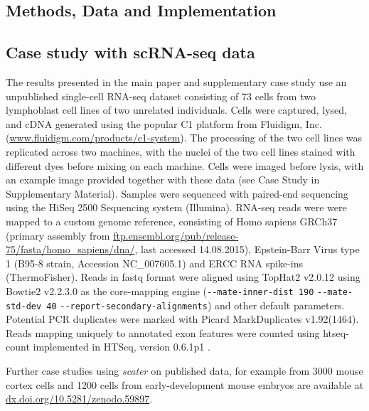 \documentclass{bioinfo}
\begin{document}
\begin{methods}
\section{Methods, Data and Implementation}\label{methods-data-and-implementation}

\subsection{Case study with scRNA-seq data}\label{case-study-with-scrna-seq-data}

The results presented in the main paper and supplementary case study use an unpublished single-cell RNA-seq dataset consisting of 73 cells from two lymphoblast cell lines of two unrelated individuals. Cells were captured, lysed, and cDNA generated using the popular C1 platform from Fluidigm, Inc. (\href{https://www.fluidigm.com/products/c1-system}{www.fluidigm.com/products/c1-system}). The processing of the two cell lines was replicated across two machines, with the nuclei of the two cell lines stained with different dyes before mixing on each machine. Cells were imaged before lysis, with an example image provided together with these data (see Case Study in Supplementary Material). Samples were sequenced with paired-end sequencing using the HiSeq 2500 Sequencing system (Illumina). RNA-seq reads were were mapped to a custom genome reference, consisting of Homo sapiens GRCh37 (primary assembly from \href{ftp://ftp.ensembl.org/pub/release-75/fasta/homo_sapiens/dna/}{ftp.ensembl.org/pub/release-75/fasta/homo\_sapiens/dna/}, last accessed 14.08.2015), Epstein-Barr Virus type 1 (B95-8 strain, Accession NC\_007605.1) and ERCC RNA spike-ins (ThermoFisher).  Reads in fastq format were aligned using TopHat2 v2.0.12 \citep{Kim2013-qb} using Bowtie2 v2.2.3.0 \citep{Langmead2012-yc} as the core-mapping engine (\verb|--mate-inner-dist 190| \verb|--mate-std-dev 40| \verb|--report-secondary-alignments|) and other default parameters. Potential PCR duplicates were marked with Picard MarkDuplicates v1.92(1464). Reads mapping uniquely to annotated exon features were counted using htseq-count implemented in HTSeq, version 0.6.1p1 \citep{Anders2015-wf}.

Further case studies using \emph{scater} on published data, for example from 3000 mouse cortex cells \citep{Zeisel2015-ab} and 1200 cells from early-development mouse embryos \citep{Scialdone2016-oa} are available at \href{http://dx.doi.org/10.5281/zenodo.59897}{dx.doi.org/10.5281/zenodo.59897}.


\end{methods}
\end{document}
